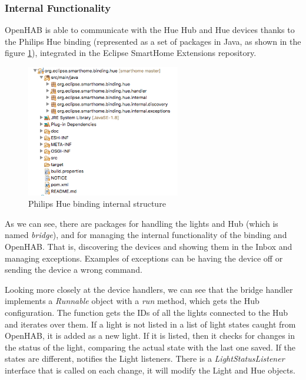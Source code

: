 \subsubsection{Internal Functionality}
OpenHAB is able to communicate with the Hue Hub and Hue devices thanks to the Philips Hue binding (represented as a set of packages 
in Java, as shown in the figure \ref{fig:hue-binding-structure}), integrated in the Eclipse SmartHome Extensions repository. 

\begin{figure}
    \centering
    \includegraphics[width=0.6\textwidth]{images/Chapter_06/hue-binding-structure.png}
    \caption{Philips Hue binding internal structure}
    \label{fig:hue-binding-structure}
\end{figure}

As we can see, there are packages for handling the lights and Hub (which is named \textit{bridge}), and for managing the internal 
functionality of the binding and OpenHAB. That is, discovering the devices and showing them in the Inbox and managing exceptions. 
Examples of exceptions can be having the device off or sending the device a wrong command.

Looking more closely at the device handlers, we can see that the bridge handler implements a \textit{Runnable} object with a 
\textit{run} method, which gets the Hub configuration. The function gets the IDs of all the lights connected to the Hub and iterates 
over them. If a light is not listed in a list of light states caught from OpenHAB, it is added as a new light. If it is listed, then 
it checks for changes in the status of the light, comparing the actual state with the last one saved. If the states are different, 
notifies the Light listeners. There is a \textit{LightStatusListener} interface that is called on each change, it will modify the 
Light and Hue objects.

